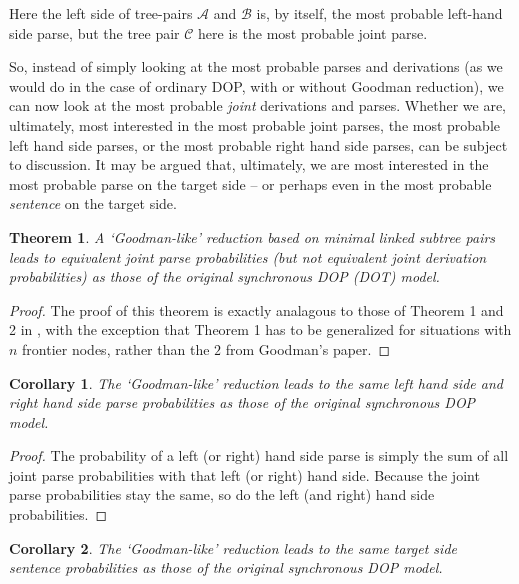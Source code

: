 \documentclass[a4paper]{article}
\newtheorem{theorem}{Theorem}[section]
\newtheorem{corollary}{Corollary}[section]
\theoremstyle{definition}
\begin{document}
Here the left side of tree-pairs $\mathcal{A}$ and $\mathcal{B}$ is, by itself, the
most probable left-hand side parse, but the tree pair $\mathcal{C}$ here is the
most probable joint parse.

So, instead of simply looking at the most probable parses and derivations (as we would do in the case of ordinary DOP, with or without Goodman reduction), we can now look at the most probable \emph{joint} derivations and parses. Whether we are, ultimately, most interested in the most probable joint parses, the most probable left hand side parses, or the most probable right hand side parses, can be subject to discussion. It may be argued that, ultimately, we are most interested in the most probable parse on the target side -- or perhaps even in the most probable \emph{sentence} on the target side.

\begin{theorem}
A `Goodman-like' reduction based on minimal linked subtree pairs leads to
equivalent joint parse probabilities (but not equivalent joint derivation
probabilities) as those of the original synchronous DOP (DOT) model.
\end{theorem}

\begin{proof}
The proof of this theorem is exactly analagous to those of Theorem 1 and 2 in \citet{goodman2003efficient}, with the exception that Theorem 1 has to be generalized for
situations with $n$ frontier nodes, rather than the $2$ from Goodman's paper.
\end{proof}

\begin{corollary}
The `Goodman-like' reduction leads to the same left hand side and right hand side parse probabilities as those of the original synchronous DOP model.
\end{corollary}

\begin{proof}
The probability of a left (or right) hand side parse is simply the sum of all joint parse
probabilities with that left (or right) hand side. Because the joint parse probabilities stay the same, so do the left (and right) hand side probabilities.
\end{proof}

\begin{corollary}
The `Goodman-like' reduction leads to the same target side sentence probabilities as those of the original synchronous DOP model.
\end{corollary}
\end{document}
